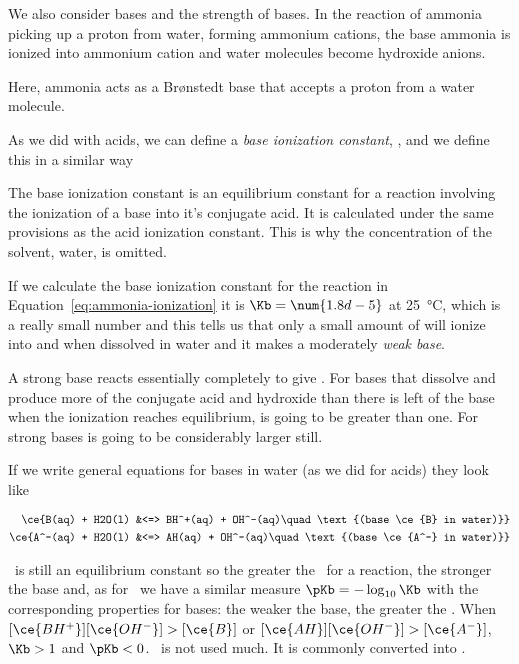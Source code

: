 \documentclass[../mit-general-chemistry.tex]{subfiles}
\begin{document}
We also consider bases and the strength of bases. In the reaction of
ammonia picking up a proton from water, forming ammonium cations, the
base ammonia is ionized into ammonium cation and water molecules
become hydroxide anions.


Here, ammonia acts as a Brønstedt base that accepts a proton from a
water molecule.

As we did with acids, we can define a {\em base ionization constant},
\Kb, and we define this in a similar way

\ceeq{
  \Kb = \frac{[NH4^-][OH^-]}{[NH3]}
}

The base ionization constant is an equilibrium constant for a reaction
involving the ionization of a base into it's conjugate acid. It is
calculated under the same provisions as the acid ionization
constant. This is why the concentration of the solvent, water, is
omitted.

If we calculate the base ionization constant for the reaction in
Equation~\ref{eq:ammonia-ionization} it is $\Kb = \num{1.8d-5}$ at
\SI{25}{\celsius}, which is a really small number and this tells us
that only a small amount of  will ionize into  and
 when dissolved in water and it makes  a moderately {\em weak base}.


A strong base reacts essentially completely to give . For
bases that dissolve and produce more of the conjugate acid and
hydroxide than there is left of the base when the ionization reaches
equilibrium, \Kb is going to be greater than one. For strong bases \Kb
is going to be considerably larger still.



If we write general equations for bases in water (as we did for acids)
they look like

\begin{align}
  \ce{B(aq) + H2O(l) &<=> BH^+(aq) + OH^-(aq)\quad\text{(base \ce{B} in water)}} \\
  \ce{A^-(aq) + H2O(l) &<=> AH(aq) + OH^-(aq)\quad\text{(base \ce{A^-} in water)}}
\end{align}

\Kb\ is still an equilibrium constant so the greater the \Kb\ for a
reaction, the stronger the base and, as for \Ka\ we have a similar
measure $\pKb = - \log_{10} \Kb$ with the corresponding properties for
bases: the weaker the base, the greater the \pKb. When
$[\ce{BH^+}][\ce{OH^-}] > [\ce{B}]$ or $[\ce{AH}][\ce{OH^-}] >
[\ce{A^-}]$, $\Kb > 1$ and $\pKb < 0$. \pKb\ is not used much. It is
commonly converted into \pKa.
\end{document}
